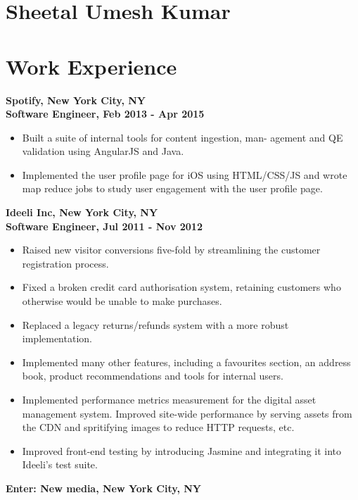 \documentclass{article}
\begin{document}
\begin{minipage}[t]{3.8in} 
\vspace{-30pt}
\section *{\Huge Sheetal Umesh Kumar} 
\vspace{28pt}
 \section*{Work Experience}
     {\bf Spotify, New York City, NY} \\
      {\bf Software Engineer,  Feb 2013 - Apr 2015} 
      \begin{itemize}
      \item
     Built a suite of internal tools for content ingestion, man-
agement and QE validation using AngularJS and Java.
       \item
     Implemented the user profile page for iOS using
HTML/CSS/JS and wrote map reduce jobs to study user
engagement with the user profile page.
      \end{itemize}
      {\bf Ideeli Inc, New York City, NY} \\
      {\bf Software Engineer, Jul 2011 - Nov 2012}
      \begin{itemize}
      \item
      Raised new visitor conversions five-fold by streamlining the customer registration process.      
      \item
      Fixed a broken credit card authorisation system, retaining customers who otherwise would be unable to make purchases.
      \item 
      Replaced a legacy returns/refunds system with a more robust implementation.
      \item
      Implemented many other features, including a favourites section, an address book, product recommendations and tools for internal users.
      \item
      Implemented performance metrics measurement for the digital asset management system. Improved site-wide performance by serving assets from the CDN and spritifying images to reduce HTTP requests, etc. 
      \item
       Improved front-end testing by introducing Jasmine and integrating it into Ideeli's test suite. 
       \end{itemize}
      {\bf Enter: New media, New York City, NY} \\

\end{minipage}
\end{document}
